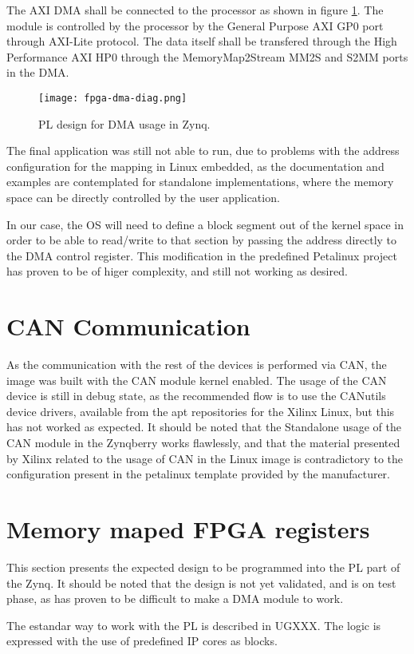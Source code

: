 The AXI DMA shall be connected to the processor as shown in figure \ref{fig:fpga-dma-diag}. The
module is controlled by the processor by the General Purpose AXI GP0 port through AXI-Lite protocol.
The data itself shall be transfered through the High Performance AXI HP0 through the
MemoryMap2Stream MM2S and S2MM ports in the DMA.

\begin{figure}[htp]
	\centering
	\texttt{[image: fpga-dma-diag.png]}
	\caption{PL design for DMA usage in Zynq.}
	\label{fig:fpga-dma-diag}
\end{figure}

The final application was still not able to run, due to problems with the address configuration for
the mapping in Linux embedded, as the documentation and examples are contemplated for standalone
implementations, where the memory space can be directly controlled by the user application.

In our case, the OS will need to define a block segment out of the kernel space in order to be able
to read/write to that section by passing the address directly to the DMA control register. This
modification in the predefined Petalinux project has proven to be of higer complexity, and still not
working as desired.

\section{CAN Communication}

As the communication with the rest of the devices is performed via CAN, the image was built with the
CAN module kernel enabled. The usage of the CAN device is still in debug state, as the recommended
flow is to use the CANutils device drivers, available from the apt repositories for the Xilinx
Linux, but this has not worked as expected. It should be noted that the Standalone usage of the CAN
module in the Zynqberry works flawlessly, and that the material presented by Xilinx related to
the usage of CAN in the Linux image is contradictory to the configuration present in the petalinux
template provided by the manufacturer.

\section{Memory maped FPGA registers}

This section presents the expected design to be programmed into the PL part of the Zynq. It should
be noted that the design is not yet validated, and is on test phase, as has proven to be difficult
to make a DMA module to work.

The estandar way to work with the PL is described in UGXXX. The logic is expressed with the use of
predefined IP cores as blocks.

